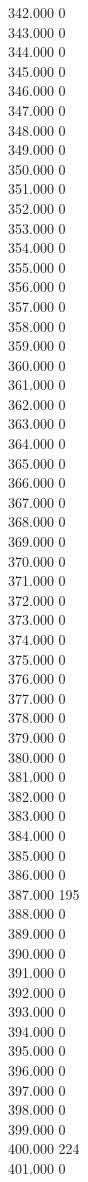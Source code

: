 { 342.000	0 \\
 343.000	0 \\
 344.000	0 \\
 345.000	0 \\
 346.000	0 \\
 347.000	0 \\
 348.000	0 \\
 349.000	0 \\
 350.000	0 \\
 351.000	0 \\
 352.000	0 \\
 353.000	0 \\
 354.000	0 \\
 355.000	0 \\
 356.000	0 \\
 357.000	0 \\
 358.000	0 \\
 359.000	0 \\
 360.000	0 \\
 361.000	0 \\
 362.000	0 \\
 363.000	0 \\
 364.000	0 \\
 365.000	0 \\
 366.000	0 \\
 367.000	0 \\
 368.000	0 \\
 369.000	0 \\
 370.000	0 \\
 371.000	0 \\
 372.000	0 \\
 373.000	0 \\
 374.000	0 \\
 375.000	0 \\
 376.000	0 \\
 377.000	0 \\
 378.000	0 \\
 379.000	0 \\
 380.000	0 \\
 381.000	0 \\
 382.000	0 \\
 383.000	0 \\
 384.000	0 \\
 385.000	0 \\
 386.000	0 \\
 387.000	195 \\
 388.000	0 \\
 389.000	0 \\
 390.000	0 \\
 391.000	0 \\
 392.000	0 \\
 393.000	0 \\
 394.000	0 \\
 395.000	0 \\
 396.000	0 \\
 397.000	0 \\
 398.000	0 \\
 399.000	0 \\
 400.000	224 \\
 401.000	0 \\
}
